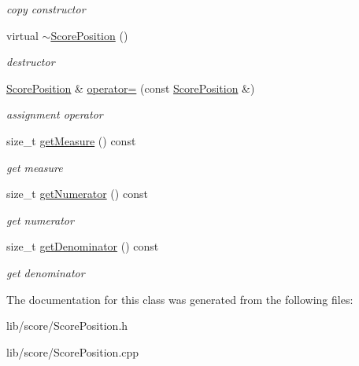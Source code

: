 \begin{DoxyCompactItemize}
\begin{DoxyCompactList}\small\item\em copy constructor \end{DoxyCompactList}\item 
\hypertarget{classsinsy_1_1ScorePosition_ae6400e1ae35a3bbd079593e0cff8773d}{virtual \hyperlink{classsinsy_1_1ScorePosition_ae6400e1ae35a3bbd079593e0cff8773d}{$\sim$\-Score\-Position} ()}\label{classsinsy_1_1ScorePosition_ae6400e1ae35a3bbd079593e0cff8773d}

\begin{DoxyCompactList}\small\item\em destructor \end{DoxyCompactList}\item 
\hypertarget{classsinsy_1_1ScorePosition_aa14e036a987d6b14eb25074beb3bfdee}{\hyperlink{classsinsy_1_1ScorePosition}{\-Score\-Position} \& \hyperlink{classsinsy_1_1ScorePosition_aa14e036a987d6b14eb25074beb3bfdee}{operator=} (const \hyperlink{classsinsy_1_1ScorePosition}{\-Score\-Position} \&)}\label{classsinsy_1_1ScorePosition_aa14e036a987d6b14eb25074beb3bfdee}

\begin{DoxyCompactList}\small\item\em assignment operator \end{DoxyCompactList}\item 
\hypertarget{classsinsy_1_1ScorePosition_ae54a343ad9c263287f9bf83811b87cf1}{size\-\_\-t \hyperlink{classsinsy_1_1ScorePosition_ae54a343ad9c263287f9bf83811b87cf1}{get\-Measure} () const }\label{classsinsy_1_1ScorePosition_ae54a343ad9c263287f9bf83811b87cf1}

\begin{DoxyCompactList}\small\item\em get measure \end{DoxyCompactList}\item 
\hypertarget{classsinsy_1_1ScorePosition_a88f706577270a8804f054aafe259a79f}{size\-\_\-t \hyperlink{classsinsy_1_1ScorePosition_a88f706577270a8804f054aafe259a79f}{get\-Numerator} () const }\label{classsinsy_1_1ScorePosition_a88f706577270a8804f054aafe259a79f}

\begin{DoxyCompactList}\small\item\em get numerator \end{DoxyCompactList}\item 
\hypertarget{classsinsy_1_1ScorePosition_a32949ba0558fd64faa80ebb3f40e44ff}{size\-\_\-t \hyperlink{classsinsy_1_1ScorePosition_a32949ba0558fd64faa80ebb3f40e44ff}{get\-Denominator} () const }\label{classsinsy_1_1ScorePosition_a32949ba0558fd64faa80ebb3f40e44ff}

\begin{DoxyCompactList}\small\item\em get denominator \end{DoxyCompactList}\end{DoxyCompactItemize}


\-The documentation for this class was generated from the following files\-:\begin{DoxyCompactItemize}
\item 
lib/score/\-Score\-Position.\-h\item 
lib/score/\-Score\-Position.\-cpp\end{DoxyCompactItemize}
